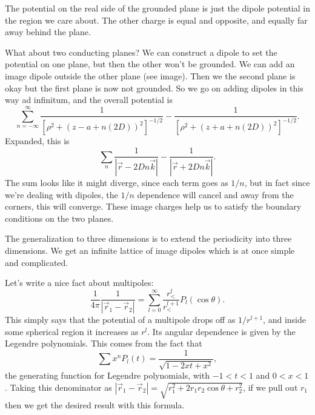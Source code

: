 \begin{exm}
    The potential on the real side of the grounded plane is just the dipole potential in the region we care about. The other charge is equal and opposite, and equally far away behind the plane.
    
    What about two conducting planes? We can construct a dipole to set the potential on one plane, but then the other won't be grounded. We can add an image dipole outside the other plane (see image). Then we the second plane is okay but the first plane is now not grounded. So we go on adding dipoles in this way ad infinitum, and the overall potential is
    \begin{equation}
        \sum_{n=-\infty}^\infty \frac{1}{[\rho^2 + (z-a+n(2D))^2]^{-1/2}}-\frac{1}{[\rho^2 + (z+a+n(2D))^2]^{-1/2}}.
    \end{equation}
    Expanded, this is
    \begin{equation}
        \sum_n \frac{1}{|\vec r - 2Dn \vec k|}  - \frac{1}{|\vec r + 2D n \vec k|}.
    \end{equation}
    The sum looks like it might diverge, since each term goes as $1/n$, but in fact since we're dealing with dipoles, the $1/n$ dependence will cancel and away from the corners, this will converge.
    These image charges help us to satisfy the boundary conditions on the two planes.
    
    The generalization to three dimensions is to extend the periodicity into three dimensions. We get an infinite lattice of image dipoles which is at once simple and complicated.
\end{exm}

Let's write a nice fact about multipoles:
\begin{equation}
    \frac{1}{4\pi} \frac{1}{|\vec r_1 - \vec r_2|} = \sum_{l=0}^\infty \frac{r_< ^l}{r_<^{l+1}} P_l(\cos\theta).
\end{equation}
This simply says that the potential of a multipole drops off as $1/r^{l+1}$, and inside some spherical region it increases as $r^l$. Its angular dependence is given by the Legendre polynomials. This comes from the fact that
\begin{equation}
    \sum x^n P_l(t) = \frac{1}{\sqrt{1-2xt+x^2}},
\end{equation}
the generating function for Legendre polynomials, with $-1<t<1$ and $0<x<1$.%
Taking this denominator as $|\vec r_1 - \vec r_2| = \sqrt{r_1^2 +2r_1 r_2\cos\theta + r_2^2}$, if we pull out $r_1$ then we get the desired result with this formula.

